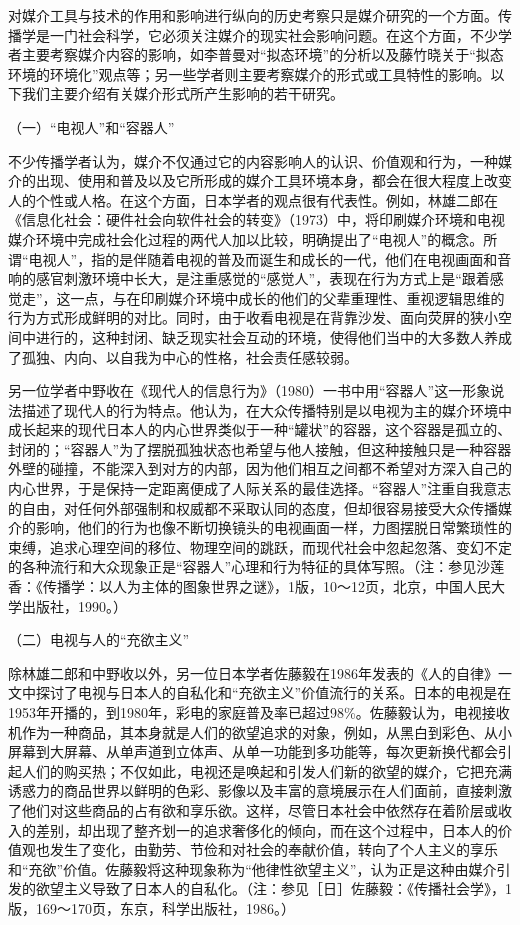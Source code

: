 \documentclass[UTF8,12pt]{ctexart}
\numberwithin{equation}{section} %
\numberwithin{figure}{section}
\numberwithin{table}{section}
\begin{document}
	
	对媒介工具与技术的作用和影响进行纵向的历史考察只是媒介研究的一个方面。传播学是一门社会科学，它必须关注媒介的现实社会影响问题。在这个方面，不少学者主要考察媒介内容的影响，如李普曼对“拟态环境”的分析以及藤竹晓关于“拟态环境的环境化”观点等；另一些学者则主要考察媒介的形式或工具特性的影响。以下我们主要介绍有关媒介形式所产生影响的若干研究。
	
	（一）“电视人”和“容器人”
	
	不少传播学者认为，媒介不仅通过它的内容影响人的认识、价值观和行为，一种媒介的出现、使用和普及以及它所形成的媒介工具环境本身，都会在很大程度上改变人的个性或人格。在这个方面，日本学者的观点很有代表性。例如，林雄二郎在《信息化社会：硬件社会向软件社会的转变》（1973）中，将印刷媒介环境和电视媒介环境中完成社会化过程的两代人加以比较，明确提出了“电视人”的概念。所谓“电视人”，指的是伴随着电视的普及而诞生和成长的一代，他们在电视画面和音响的感官刺激环境中长大，是注重感觉的“感觉人”，表现在行为方式上是“跟着感觉走”，这一点，与在印刷媒介环境中成长的他们的父辈重理性、重视逻辑思维的行为方式形成鲜明的对比。同时，由于收看电视是在背靠沙发、面向荧屏的狭小空间中进行的，这种封闭、缺乏现实社会互动的环境，使得他们当中的大多数人养成了孤独、内向、以自我为中心的性格，社会责任感较弱。
	
	另一位学者中野收在《现代人的信息行为》（1980）一书中用“容器人”这一形象说法描述了现代人的行为特点。他认为，在大众传播特别是以电视为主的媒介环境中成长起来的现代日本人的内心世界类似于一种“罐状”的容器，这个容器是孤立的、封闭的；“容器人”为了摆脱孤独状态也希望与他人接触，但这种接触只是一种容器外壁的碰撞，不能深入到对方的内部，因为他们相互之间都不希望对方深入自己的内心世界，于是保持一定距离便成了人际关系的最佳选择。“容器人”注重自我意志的自由，对任何外部强制和权威都不采取认同的态度，但却很容易接受大众传播媒介的影响，他们的行为也像不断切换镜头的电视画面一样，力图摆脱日常繁琐性的束缚，追求心理空间的移位、物理空间的跳跃，而现代社会中忽起忽落、变幻不定的各种流行和大众现象正是“容器人”心理和行为特征的具体写照。（注：参见沙莲香：《传播学：以人为主体的图象世界之谜》，1版，10～12页，北京，中国人民大学出版社，1990。）
	
	（二）电视与人的“充欲主义”
	
	除林雄二郎和中野收以外，另一位日本学者佐藤毅在1986年发表的《人的自律》一文中探讨了电视与日本人的自私化和“充欲主义”价值流行的关系。日本的电视是在1953年开播的，到1980年，彩电的家庭普及率已超过98\%。佐藤毅认为，电视接收机作为一种商品，其本身就是人们的欲望追求的对象，例如，从黑白到彩色、从小屏幕到大屏幕、从单声道到立体声、从单一功能到多功能等，每次更新换代都会引起人们的购买热；不仅如此，电视还是唤起和引发人们新的欲望的媒介，它把充满诱惑力的商品世界以鲜明的色彩、影像以及丰富的意境展示在人们面前，直接刺激了他们对这些商品的占有欲和享乐欲。这样，尽管日本社会中依然存在着阶层或收入的差别，却出现了整齐划一的追求奢侈化的倾向，而在这个过程中，日本人的价值观也发生了变化，由勤劳、节俭和对社会的奉献价值，转向了个人主义的享乐和“充欲”价值。佐藤毅将这种现象称为“他律性欲望主义”，认为正是这种由媒介引发的欲望主义导致了日本人的自私化。（注：参见［日］佐藤毅：《传播社会学》，1版，169～170页，东京，科学出版社，1986。）
	
\end{document}
